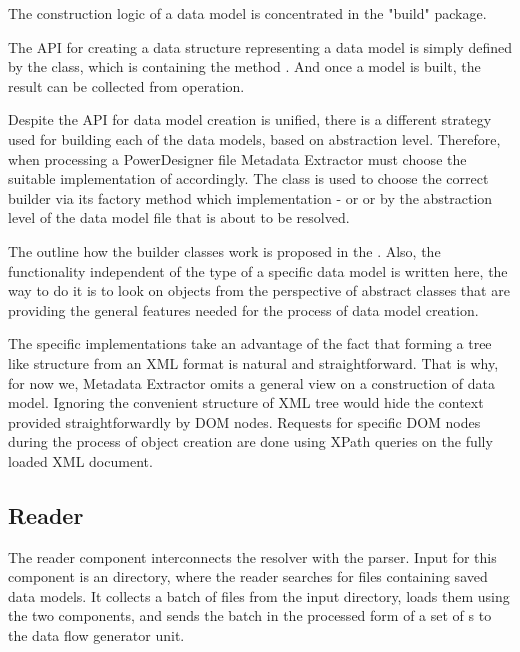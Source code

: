 The construction logic of a data model is concentrated in the "build" package.

The API for creating a data structure representing a data model is simply defined by the   class, which is containing the method . And once a model is built, the result can be collected from  operation.

Despite the API for data model creation is unified, there is a different strategy used for building each of the data models, based on abstraction level. 
Therefore, when processing a PowerDesigner file Metadata Extractor must choose the suitable implementation of  accordingly. 
The class  is used to choose the correct builder via its factory method which implementation -  or  or  by the abstraction level of the data model file that is about to be resolved.

The outline how the builder classes work is proposed in the . 
Also, the functionality independent of the type of a specific data model is written here, the way to do it is to look on objects from the perspective of abstract classes that are providing the general features needed for the process of data model creation.

The specific implementations take an advantage of the fact that forming a tree like structure from an XML format is natural and straightforward. That is why, for now we, Metadata Extractor omits a general view on a construction of data model. Ignoring the convenient structure of XML tree would hide the context provided straightforwardly by DOM nodes. 
Requests for specific DOM nodes during the process of object creation are done using XPath queries on the fully loaded XML document.

\subsection{Reader}

The reader component interconnects the resolver with the parser. Input for this component is an directory, where the reader searches for files containing saved data models. It collects a batch of files from the input directory, loads them using the two components, and sends the batch in the processed form of a set of s to the data flow generator unit.

